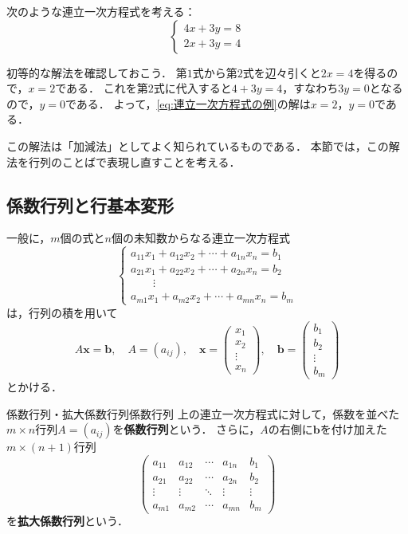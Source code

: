 次のような連立一次方程式を考える：
\begin{equation}
  \begin{cases}
    4x + 3y = 8 \\
    2x + 3y = 4
  \end{cases} \label{eq:連立一次方程式の例}
\end{equation}

初等的な解法を確認しておこう．
第$1$式から第$2$式を辺々引くと$2x = 4$を得るので，$x = 2$である．
これを第$2$式に代入すると$4 + 3y = 4$，すなわち$3y = 0$となるので，$y = 0$である．
よって，\eqref{eq:連立一次方程式の例}の解は$x = 2$，$y = 0$である．

この解法は「加減法」としてよく知られているものである．
本節では，この解法を行列のことばで表現し直すことを考える．

\subsection{係数行列と行基本変形}

一般に，$m$個の式と$n$個の未知数からなる連立一次方程式
\[
  \begin{cases}
    a_{11}x_1 + a_{12}x_2 + \cdots + a_{1n}x_n = b_1 \\
    a_{21}x_1 + a_{22}x_2 + \cdots + a_{2n}x_n = b_2 \\
    \hspace{2em} \vdots \\
    a_{m1}x_1 + a_{m2}x_2 + \cdots + a_{mn}x_n = b_m
  \end{cases}
\]
は，行列の積を用いて
\[
  A\bm{x} = \bm{b}, \quad
  A = (a_{ij}), \quad
  \bm{x} = \begin{pmatrix} x_1 \\ x_2 \\ \vdots \\ x_n \end{pmatrix}, \quad
  \bm{b} = \begin{pmatrix} b_1 \\ b_2 \\ \vdots \\ b_m \end{pmatrix}
\]
とかける．

\begin{definition}{係数行列・拡大係数行列}{係数行列}
  上の連立一次方程式に対して，係数を並べた$m \times n$行列$A = (a_{ij})$を\textbf{係数行列}という．
  さらに，$A$の右側に$\bm{b}$を付け加えた$m \times (n + 1)$行列
  \[
    \begin{pmatrix}
      a_{11} & a_{12} & \cdots & a_{1n} & b_1 \\
      a_{21} & a_{22} & \cdots & a_{2n} & b_2 \\
      \vdots & \vdots & \ddots & \vdots & \vdots \\
      a_{m1} & a_{m2} & \cdots & a_{mn} & b_m
    \end{pmatrix}
  \]
  を\textbf{拡大係数行列}という．
\end{definition}

